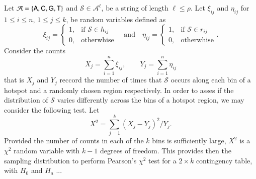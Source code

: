 \documentclass{bioinfo}
\begin{document}

Let $\mathcal A = \{\sf A, C, G, T\}$ and $\mathcal S \in \mathcal A^\ell$, be a string of length $\ell \leq \rho$. Let $\xi_{ij}$ and $\eta_{ij}$ for $1 \leq i \leq n$, $1 \leq j \leq k$, be random variables defined as 
\[
   \xi_{ij} = %
    \begin{cases}
     1, & \text{if } \mathcal S \in h_{ij}\\
     0, &\text{otherwhise}
    \end{cases}
    \quad\text{and}\quad
   \eta_{ij} = %
       \begin{cases}
     1, &\text{if } \mathcal S \in r_{ij}\\
     0, &\text{otherwhise}
    \end{cases}.
\]
Consider the counts
\[
   X_j = \sum_{i=1}^n \xi_{ij}, \qquad 
   Y_j = \sum_{i=1}^n \eta_{ij}
\]
that is $X_j$ and $Y_j$ reccord the number of times that $\mathcal S$ occurs along each bin of a hotspot and a randomly chosen region respectively. In order to asses if the distribution of $\mathcal S$ varies differently across the bins of a hotspot region, we may consider the following test. Let
\[
  X^{2} = \sum_{j=1}^k (X_{j}-Y_{j})^2/Y_{j}.
\]
Provided the number of counts in each of the $k$ bins is sufficiently large, $X^{2}$ is a $\chi^{2}$ random variable with $k-1$ degrees of freedom. This provides then the sampling distribution to perform Pearson's $\chi^{2}$ test for a $2\times k$ contingency table, with $H_{0}$ and $H_{a}$ ...



\scriptsize{
   
\normalsize
}
\end{document}
